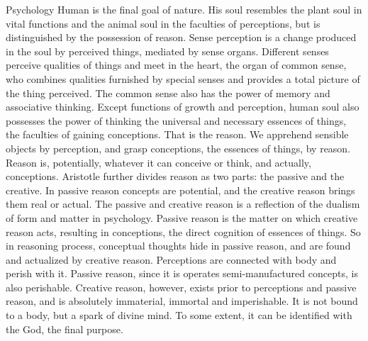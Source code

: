 \documentclass[11pt]{article}
\begin{document}
Psychology
  Human is the final goal of nature. His soul resembles the plant soul in vital functions and the animal soul in the faculties of perceptions, but is distinguished by the possession of reason. Sense perception is a change produced in the soul by perceived things, mediated by sense organs. Different senses perceive qualities of things and meet in the heart, the organ of common sense, who combines qualities furnished by special senses and provides a total picture of the thing perceived. The common sense also has the power of memory and associative thinking.
  Except functions of growth and perception, human soul also possesses the power of thinking the universal and necessary essences of things, the faculties of gaining conceptions. That is the reason. We apprehend sensible objects by perception, and grasp conceptions, the essences of things, by reason. Reason is, potentially, whatever it can conceive or think, and actually, conceptions.
  Aristotle further divides reason as two parts: the passive and the creative. In passive reason concepts are potential, and the creative reason brings them real or actual. The passive and creative reason is a reflection of the dualism of form and matter in psychology. Passive reason is the matter on which creative reason acts, resulting in conceptions, the direct cognition of essences of things. So in reasoning process, conceptual thoughts hide in passive reason, and are  found and actualized by creative reason.
  Perceptions are connected with body and perish with it. Passive reason, since it is operates semi-manufactured concepts, is also perishable. Creative reason, however, exists prior to perceptions and passive reason, and is absolutely immaterial, immortal and imperishable. It is not bound to a body, but a spark of divine mind. To some extent, it can be identified with the God, the final purpose.
\end{document}
